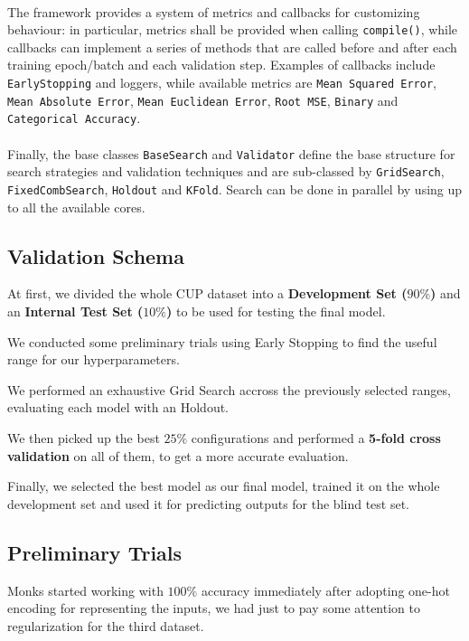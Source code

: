 \paragraph{}

The framework provides a system of metrics and callbacks for customizing behaviour: in particular, metrics shall be provided when calling \texttt{compile()}, while callbacks can implement a series of methods that are called before and after each training epoch/batch and each validation step. Examples of callbacks include \texttt{EarlyStopping} and loggers, while available metrics are \texttt{Mean Squared Error}, \texttt{Mean Absolute Error}, \texttt{Mean Euclidean Error}, \texttt{Root MSE}, \texttt{Binary} and \texttt{Categorical Accuracy}.

\paragraph{}

Finally, the base classes \texttt{BaseSearch} and \texttt{Validator} define the base structure for search strategies and validation techniques and are sub-classed by \texttt{GridSearch}, \texttt{FixedCombSearch}, \texttt{Holdout} and \texttt{KFold}. Search can be done in parallel by using up to all the available cores.


\subsection{Validation Schema}
At first, we divided the whole CUP dataset into a \textbf{Development Set ($90\%$)} and an \textbf{Internal Test Set ($10\%$)} to be used for testing the final model. 

We conducted some preliminary trials using Early Stopping to find the useful range for our hyperparameters.

We performed an exhaustive Grid Search accross the previously selected ranges, evaluating each model with an Holdout. 

We then picked up the best $25\%$ configurations and performed a \textbf{5-fold cross validation} on all of them, to get a more accurate evaluation. 

Finally, we selected the best model as our final model, trained it on the whole development set and used it for predicting outputs for the blind test set.

\subsection{Preliminary Trials}
\label{subsection:preliminary_trials}
Monks started working with $100\%$ accuracy immediately after adopting one-hot encoding for representing the inputs, we had just to pay some attention to regularization for the third dataset.

